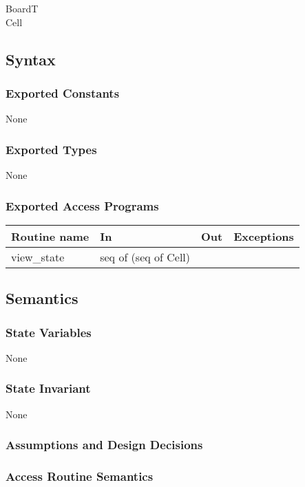 \documentclass[12pt]{article}
\begin{document}
BoardT\\
Cell

\subsection* {Syntax}

\subsubsection* {Exported Constants}

None

\subsubsection* {Exported Types}

None

\subsubsection* {Exported Access Programs}

\begin{tabular}{| l | l | l | p{5cm} |}
\hline
\textbf{Routine name} & \textbf{In} & \textbf{Out} & \textbf{Exceptions}\\
\hline
view\_state & seq of (seq of Cell) & &\\
\hline
\end{tabular}

\subsection* {Semantics}

\subsubsection* {State Variables}

None

\subsubsection* {State Invariant}

None

\subsubsection* {Assumptions and Design Decisions}

\subsubsection* {Access Routine Semantics}
\end{document}
